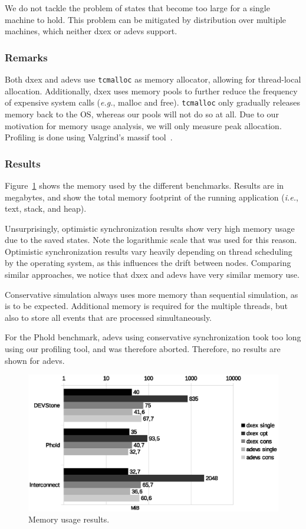 We do not tackle the problem of states that become too large for a single machine to hold.
This problem can be mitigated by distribution over multiple machines, which neither dxex or adevs support.

\subsubsection{Remarks}
Both dxex and adevs use \texttt{tcmalloc} as memory allocator, allowing for thread-local allocation.
Additionally, dxex uses memory pools to further reduce the frequency of expensive system calls (\textit{e.g.}, malloc and free).
\texttt{tcmalloc} only gradually releases memory back to the OS, whereas our pools will not do so at all.
Due to our motivation for memory usage analysis, we will only measure peak allocation.
Profiling is done using Valgrind's massif tool~\cite{Nethercote:2007:VFH:1273442.1250746}.
\vspace{1cm}

\subsubsection{Results}
Figure~\ref{fig:memory} shows the memory used by the different benchmarks.
Results are in megabytes, and show the total memory footprint of the running application (\textit{i.e.}, text, stack, and heap).

Unsurprisingly, optimistic synchronization results show very high memory usage due to the saved states.
Note the logarithmic scale that was used for this reason.
Optimistic synchronization results vary heavily depending on thread scheduling by the operating system, as this influences the drift between nodes.
Comparing similar approaches, we notice that dxex and adevs have very similar memory use.

Conservative simulation always uses more memory than sequential simulation, as is to be expected.
Additional memory is required for the multiple threads, but also to store all events that are processed simultaneously.

For the Phold benchmark, adevs using conservative synchronization took too long using our profiling tool, and was therefore aborted.
Therefore, no results are shown for adevs.

\begin{figure}
    \includegraphics[width=\columnwidth]{fig/memory_voorlopig.eps}
    \caption{Memory usage results.}
    \label{fig:memory}
\end{figure}

